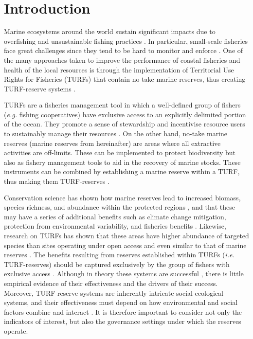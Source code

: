 \documentclass{frontiersSCNS}
\begin{document}
\hypertarget{introduction}{%
\section{Introduction}\label{introduction}}

Marine ecosystems around the world sustain significant impacts due to
overfishing and unsustainable fishing practices
\citep{pauly_2005-qV,worm_2006-IB,halpern_2008-dK}. In particular,
small-scale fisheries face great challenges since they tend to be hard
to monitor and enforce \citep{costello_2012}. One of the many approaches
taken to improve the performance of coastal fisheries and health of the
local resources is through the implementation of Territorial Use Rights
for Fisheries (TURFs) that contain no-take marine reserves, thus
creating TURF-reserve systems
\citep{afflerbach_2014,gelcich_2015,lester_2017}.

TURFs are a fisheries management tool in which a well-defined group of
fishers (\emph{e.g.} fishing cooperatives) have exclusive access to an
explicitly delimited portion of the ocean. They promote a sense of
stewardship and incentivise resource users to sustainably manage their
resources \citep{gelcich_2008,costello_2010,mccay_2014}. On the other
hand, no-take marine reserves (marine reserves from hereinafter) are
areas where all extractive activities are off-limits. These can be
implemented to protect biodiversity but also as fishery management tools
to aid in the recovery of marine stocks. These instruments can be
combined by establishing a marine reserve within a TURF, thus making
them TURF-reserves \citep{afflerbach_2014,gelcich_2015,lester_2017}.

Conservation science has shown how marine reserves lead to increased
biomass, species richness, and abundance within the protected regions
\citep{lester_2009}, and that these may have a series of additional
benefits such as climate change mitigation, protection from
environmental variability, and fisheries benefits
\citep{roberts_2017-J9,micheli_2012-EU,krueck_2017-J1}. Likewise,
research on TURFs has shown that these areas have higher abundance of
targeted species than sites operating under open access and even similar
to that of marine reserves \citep{gelcich_2008,gelcich_2012}. The
benefits resulting from reserves established within TURFs (\emph{i.e.}
TURF-reserves) should be captured exclusively by the group of fishers
with exclusive access \citep{gelcich_2015}. Although in theory these
systems are successful \citep{smallhornwest_2018}, there is little
empirical evidence of their effectiveness and the drivers of their
success. Moreover, TURF-reserve systems are inherently intricate
social-ecological systems, and their effectiveness must depend on how
environmental and social factors combine and interact
\citep{ostrom_2009,gelcich_2015}. It is therefore important to consider
not only the indicators of interest, but also the governance settings
under which the reserves operate.
\end{document}
